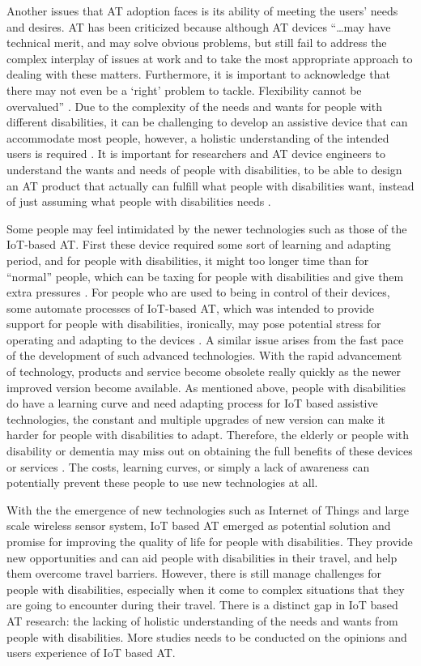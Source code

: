 Another issues that AT adoption faces is its ability of meeting the users’
needs and desires. AT has been criticized because although AT devices ``…may have
technical merit, and may solve obvious problems, but still fail to address the complex
interplay of issues at work and to take the most appropriate approach to dealing with
these matters. Furthermore, it is important to acknowledge that there may not even
be a ‘right’ problem to tackle. Flexibility cannot be overvalued'' \cite{Shah}. Due to 
the complexity of the needs and wants for people with different disabilities, it can 
be challenging to develop an assistive device that can accommodate most people, 
however, a holistic understanding of the intended users is required \cite{Shah}.
It is important for researchers and AT device engineers to understand the wants 
and needs of people with disabilities, to be able to design an AT product that 
actually can fulfill what people with disabilities want, instead of just 
assuming what people with disabilities needs \cite{Barbeau}.

Some people may feel intimidated by the newer technologies such as those of the IoT-based AT.
First these device required some sort of learning and adapting period, and for people with 
disabilities, it might too longer time than for ``normal'' people, which can be taxing for
people with disabilities and give them extra pressures \cite{Shah}. For people who are used to being
in control of their devices, some automate processes of IoT-based AT, which was intended to 
provide support for people with disabilities, ironically, may pose potential stress for 
operating and adapting to the devices \cite{Shah}.  A similar issue arises from the fast 
pace of the development of such advanced technologies. With the rapid advancement of 
technology, products and service become obsolete really quickly as the newer improved 
version become available. As mentioned above, people with disabilities do have a 
learning curve and need adapting process for IoT based assistive technologies, the 
constant and multiple upgrades of new version can make it harder for people with 
disabilities to adapt. Therefore, the elderly or people with disability or 
dementia may miss out on obtaining the full benefits of these devices or services \cite{Shah}.
The costs, learning curves, or simply a lack of awareness can potentially 
prevent these people to use new technologies at all.  

With the the emergence of new technologies such as Internet of Things 
and large scale wireless sensor system, IoT based AT emerged as potential 
solution and promise for improving the quality of life for people with 
disabilities. They provide new opportunities and can aid people with 
disabilities in their travel, and help them overcome travel barriers. 
However, there is still manage challenges for people with disabilities, 
especially when it come to complex situations that they are going to 
encounter during their travel. There is a distinct gap in IoT based AT 
research: the lacking of holistic understanding of the needs and wants 
from people with disabilities. More studies needs to be conducted on the 
opinions and users experience of IoT based AT. 

